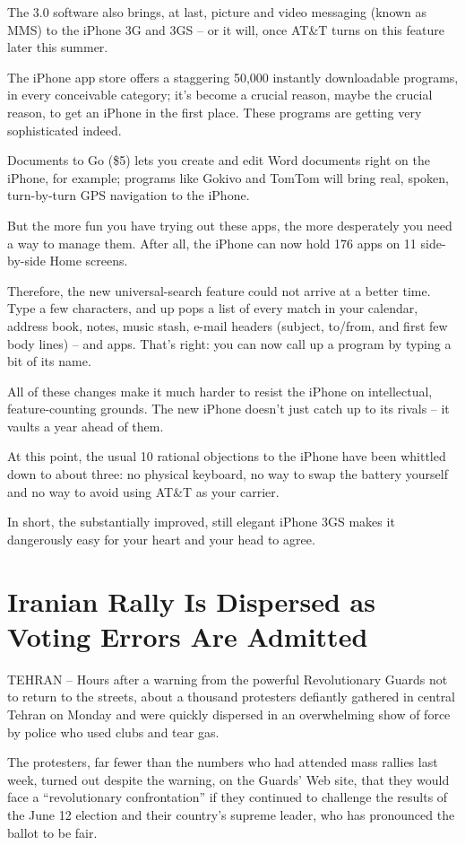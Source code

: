 ﻿\documentclass[12pt,a4paper,onecolumn]{article}
\begin{document}
The 3.0 software also brings, at last, picture and video messaging (known as MMS) to the iPhone 3G
and 3GS -- or it will, once AT\&T turns on this feature later this summer.

The iPhone app store offers a staggering 50,000 instantly downloadable programs, in every
conceivable category; it's become a crucial reason, maybe the crucial reason, to get an iPhone in
the first place. These programs are getting very sophisticated indeed.

Documents to Go (\$5) lets you create and edit Word documents right on the iPhone, for example;
programs like Gokivo and TomTom will bring real, spoken, turn-by-turn GPS navigation to the iPhone.

But the more fun you have trying out these apps, the more desperately you need a way to manage them.
After all, the iPhone can now hold 176 apps on 11 side-by-side Home screens.

Therefore, the new universal-search feature could not arrive at a better time. Type a few
characters, and up pops a list of every match in your calendar, address book, notes, music stash,
e-mail headers (subject, to/from, and first few body lines) -- and apps. That's right: you can now
call up a program by typing a bit of its name.

All of these changes make it much harder to resist the iPhone on intellectual, feature-counting
grounds. The new iPhone doesn't just catch up to its rivals -- it vaults a year ahead of them.

At this point, the usual 10 rational objections to the iPhone have been whittled down to about
three: no physical keyboard, no way to swap the battery yourself and no way to avoid using AT\&T as
your carrier.

In short, the substantially improved, still elegant iPhone 3GS makes it dangerously easy for your
heart and your head to agree.

\section{Iranian Rally Is Dispersed as Voting Errors Are Admitted}

TEHRAN -- Hours after a warning from the powerful Revolutionary Guards not to return to the streets,
about a thousand protesters defiantly gathered in central Tehran on Monday and were quickly
dispersed in an overwhelming show of force by police who used clubs and tear gas.

The protesters, far fewer than the numbers who had attended mass rallies last week, turned out
despite the warning, on the Guards' Web site, that they would face a ``revolutionary confrontation''
if they continued to challenge the results of the June 12 election and their country's supreme
leader, who has pronounced the ballot to be fair.
\end{document}
